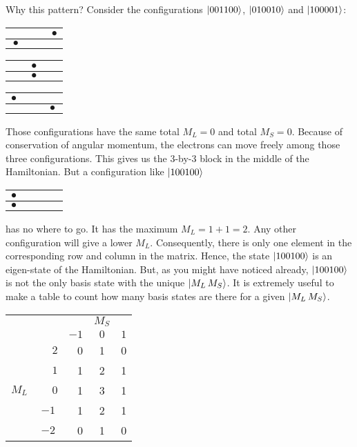 %
Why this pattern? Consider the configurations $\Ket{001100}$, $\Ket{010010}$ and $\Ket{100001}$:
\begin{center}
\begin{tabular}{|c|c|c|}
\hline
$\phantom{\bullet}$ & $\phantom{\bullet}$ & $\bullet$ \\ \hline
$\bullet$ &  &  \\
\hline
\end{tabular}
\begin{tabular}{|c|c|c|}
\hline
$\phantom{\bullet}$ & $\bullet$ & $\phantom{\bullet}$ \\ \hline
 & $\bullet$ &  \\
\hline
\end{tabular}
\begin{tabular}{|c|c|c|}
\hline
$\bullet$ & $\phantom{\bullet}$ & $\phantom{\bullet}$ \\ \hline
 &  & $\bullet$ \\
\hline
\end{tabular}
\end{center}
Those configurations have the same total $M_L = 0$ and total $M_S = 0$.
Because of conservation of angular momentum, the electrons can move freely
among those three configurations. This gives us the 3-by-3 block in the middle
of the Hamiltonian. But a configuration like $\Ket{100100}$
\begin{center}
\begin{tabular}{|c|c|c|}
\hline
$\bullet$ & $\phantom{\bullet}$ & $\phantom{\bullet}$ \\ \hline
$\bullet$ &  &  \\
\hline
\end{tabular}
\end{center}
has no where to go. It has the maximum $M_L = 1+1 = 2$.
Any other configuration will give a lower $M_L$. Consequently, there is only
one element in the corresponding row and column in the matrix.
Hence, the state $\Ket{100100}$ is an eigen-state of the Hamiltonian.
But, as you might have noticed already, $\Ket{100100}$ is not the only basis
state with the unique $\Ket{M_{L}\,M_{S}}$. It is extremely useful to make
a table to count how many basis states are there for a given
$\Ket{M_{L}\,M_{S}}$.
\begin{center}
\begin{tabular}{c c|r c r}
      &  &  & $M_S$ & \\
      &  & $-1$ & $0$ & $1$ \\ \hline
      & $\phantom{-}2$ & 0 & 1 & 0 \\
      & $\phantom{-}1$ & 1 & 2 & 1 \\
$M_L$ & $\phantom{-}0$ & 1 & 3 & 1 \\
      & $-1$ & 1 & 2 & 1 \\
      & $-2$ & 0 & 1 & 0 \\
\end{tabular}
\end{center}

